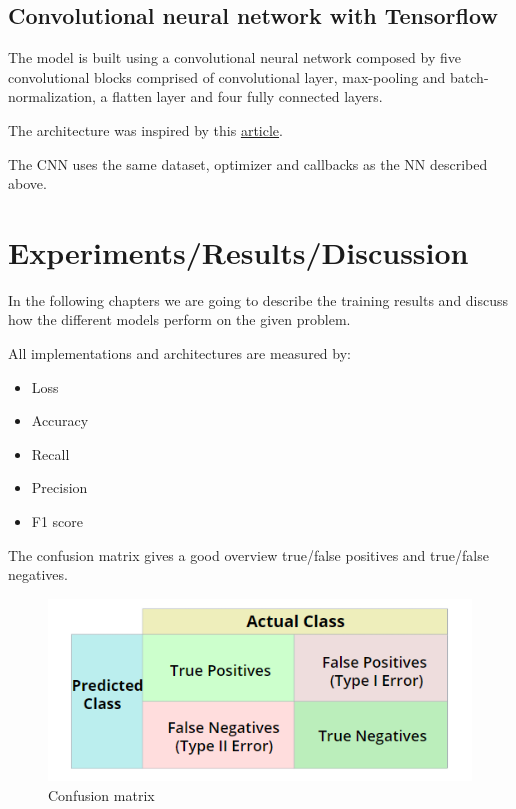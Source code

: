 \documentclass{article}
\begin{document}
\subsection{Convolutional neural network with Tensorflow}
\label{sec:convolutional_neural_network_with_tensorflow}

The model is built using a convolutional neural network composed by five convolutional blocks comprised of convolutional layer, 
max-pooling and batch-normalization, a flatten layer and four fully connected layers.

The architecture was inspired by this \href{https://towardsdatascience.com/deep-learning-for-detecting-pneumonia-from-x-ray-images-fc9a3d9fdba8}{article}.

The CNN uses the same dataset, optimizer and callbacks as the NN described above.

\section{Experiments/Results/Discussion}

In the following chapters we are going to describe the training results and discuss how the 
different models perform on the given problem.

All implementations and architectures are measured by:

\begin{itemize}
  \item Loss
  \item Accuracy
  \item Recall
  \item Precision
  \item F1 score
\end{itemize}

The confusion matrix gives a good overview true/false positives and true/false negatives.

\begin{figure}[ht]
  \centering
  \includegraphics[width=0.8\linewidth]{images/confusionMatrix.png}
  \caption{Confusion matrix}
  \label{fig:confusion_matrix}
\end{figure}
\end{document}
